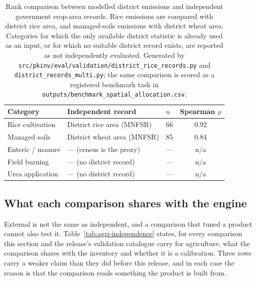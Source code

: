 \begin{table}[!htbp]
\centering
\footnotesize
\begin{tabular}{@{}lllc@{}}
\toprule
\textbf{Category} & \textbf{Independent record} & \textbf{$n$} & \textbf{Spearman $\rho$} \\
\midrule
Rice cultivation & District rice area (MNFSR) & 66 & 0.92 \\
Managed soils    & District wheat area (MNFSR) & 85 & 0.84 \\
Enteric / manure & --- (census is the proxy) & --- & n/a \\
Field burning    & --- (no district record) & --- & n/a \\
Urea application & --- (no district record) & --- & n/a \\
\bottomrule
\end{tabular}
\caption{Rank comparison between modelled district emissions and independent government
crop-area records. Rice emissions are compared with district rice area, and managed-soils
emissions with district wheat area. Categories for which the only available district
statistic is already used as an input, or for which no suitable district record exists, are
reported as not independently evaluated. Generated by
\texttt{src/pkinv/eval/validation/district\_rice\_records.py} and
\texttt{district\_records\_multi.py}; the same comparison is scored as a registered
benchmark task in \texttt{outputs/benchmark\_spatial\_allocation.csv}.}
\label{tab:distval}
\end{table}

\subsection{What each comparison shares with the engine}

External is not the same as independent, and a comparison that tuned a product cannot also
test it. Table~\ref{tab:agri-independence} states, for every comparison this section and the
release's validation catalogue carry for agriculture, what the comparison shares with the
inventory and whether it is a calibration. Three rows carry a weaker claim than they did
before this release, and in each case the reason is that the comparison reads something the
product is built from.

